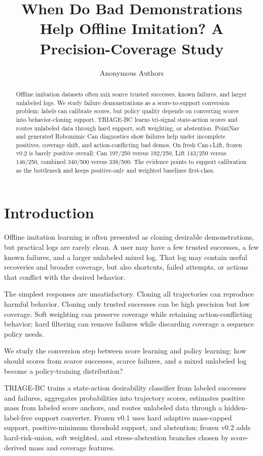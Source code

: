 \documentclass{article}
\title{When Do Bad Demonstrations Help Offline Imitation? A Precision-Coverage Study}
\author{Anonymous Authors}
\date{}
\newcommand{\method}{TRIAGE-BC}
\begin{document}
\maketitle

\begin{abstract}
Offline imitation datasets often mix scarce trusted successes, known failures, and larger unlabeled logs. We study failure demonstrations as a score-to-support conversion problem: labels can calibrate scores, but policy quality depends on converting scores into behavior-cloning support. \method{} learns tri-signal state-action scores and routes unlabeled data through hard support, soft weighting, or abstention. PointNav and generated Robomimic Can diagnostics show failures help under incomplete positives, coverage shift, and action-conflicting bad demos. On fresh Can+Lift, frozen v0.2 is barely positive overall: Can 197/250 versus 192/250, Lift 143/250 versus 146/250, combined 340/500 versus 338/500. The evidence points to support calibration as the bottleneck and keeps positive-only and weighted baselines first-class.
\end{abstract}

\section{Introduction}

Offline imitation learning is often presented as cloning desirable demonstrations, but practical logs are rarely clean. A user may have a few trusted successes, a few known failures, and a larger unlabeled mixed log. That log may contain useful recoveries and broader coverage, but also shortcuts, failed attempts, or actions that conflict with the desired behavior.

The simplest responses are unsatisfactory. Cloning all trajectories can reproduce harmful behavior. Cloning only trusted successes can be high precision but low coverage. Soft weighting can preserve coverage while retaining action-conflicting behavior; hard filtering can remove failures while discarding coverage a sequence policy needs.

We study the conversion step between score learning and policy learning: how should scores from scarce successes, scarce failures, and a mixed unlabeled log become a policy-training distribution?

\method{} trains a state-action desirability classifier from labeled successes and failures, aggregates probabilities into trajectory scores, estimates positive mass from labeled score anchors, and routes unlabeled data through a hidden-label-free support converter. Frozen v0.1 uses hard adaptive mass-capped support, positive-minimum threshold support, and abstention; frozen v0.2 adds hard-risk-union, soft weighted, and stress-abstention branches chosen by score-derived mass and coverage features.
\end{document}

